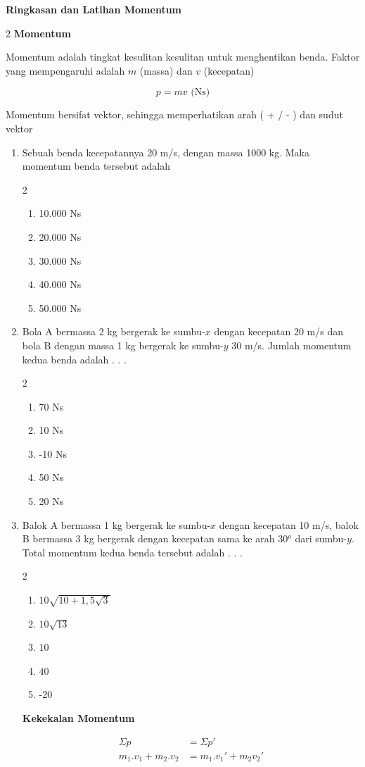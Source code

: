 \documentclass[10pt,a4paper]{extarticle}
\newcommand{\pilgani}[1]{                            \vspace{-0.3cm}\begin{multicols}{2}
 \begin{enumerate}[label=\Alph*., itemsep=0pt,topsep=0pt,leftmargin=*,align=Center]#1                     \end{enumerate}
 \phantom{ini cuma sapi, wedus, dan ayam}
 \end{multicols}}
\begin{document}
 \textbf{Ringkasan dan Latihan Momentum} \phantom{ini nama siswa yang aaamengerjakan soal kuis ini }  

\begin{multicols*}{2}
\textbf{Momentum}

Momentum adalah tingkat kesulitan kesulitan untuk menghentikan benda. Faktor yang mempengaruhi adalah $m$ (massa) dan $v$ (kecepatan)

$$ p = m v \text{  (Ns)}$$

Momentum bersifat vektor, sehingga memperhatikan arah ( + / - ) dan sudut vektor 


\begin{enumerate}
\item Sebuah benda kecepatannya 20 m/s, dengan massa 1000 kg. Maka momentum benda tersebut adalah 
\pilgani{
        \item 10.000 Ns
        \item 20.000 Ns
        \item 30.000 Ns
        \item 40.000 Ns
        \item 50.000 Ns
        }
\item Bola A bermassa 2 kg bergerak ke sumbu-$x$ dengan kecepatan 20 m/s dan bola B dengan massa 1 kg bergerak ke sumbu-$y$ 30 m/s. Jumlah momentum kedua benda adalah . . .
\pilgani{
        \item 70 Ns
        \item 10 Ns
        \item -10 Ns
        \item 50 Ns
        \item 20 Ns
        }

\item Balok A bermassa 1 kg bergerak ke sumbu-$x$ dengan kecepatan 10 m/s, balok B bermassa 3 kg bergerak dengan kecepatan sama ke arah 30$^o$ dari sumbu-$y$. Total momentum kedua benda tersebut adalah . . .
\pilgani{
        \item $10\sqrt{10+1,5\sqrt{3}}$
        \item $10\sqrt{13}$
        \item $10$
        \item $40$
        \item -20
        }
\vspace{3cm}
\textbf{Kekekalan Momentum}

\begin{align*}
\Sigma p &= \Sigma p'\\
m_1.v_1 + m_2.v_2 &= m_1.v_1' +m_2v_2'\\
\end{align*}


\end{enumerate}
\end{multicols*}
\end{document}

